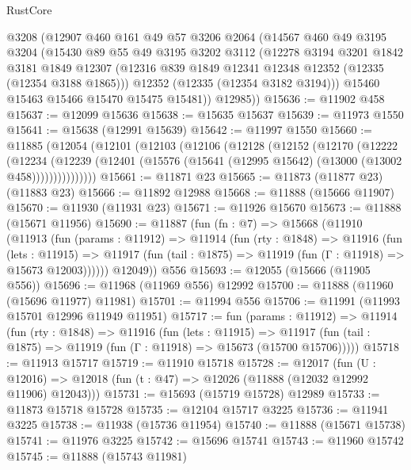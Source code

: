 \begin{lexlean}{RustCore}
\begin{coremodule}
      @3208
      (@12907
        @460
        @161
        @49
        @57
        @3206
        @2064
        (@14567
          @460
          @49
          @3195
          @3204
          (@15430
            @89
            @55
            @49
            @3195
            @3202
            @3112
            (@12278
              @3194
              @3201
              @1842
              @3181
              @1849
              @12307
              (@12316 @839 @1849 @12341 @12348 @12352 (@12335 (@12354 @3188 @1865)))
              @12352
              (@12335 (@12354 @3182 @3194)))
            @15460
            @15463
            @15466
            @15470
            @15475
            @15481))
        @12985))
@15636 := @11902 @458
@15637 := @12099 @15636
@15638 := @15635 @15637
@15639 := @11973 @1550
@15641 := @15638 (@12991 @15639)
@15642 := @11997 @1550
@15660 := @11885
    (@12054
      (@12101
        (@12103
          (@12106
            (@12128
              (@12152
                (@12170
                  (@12222
                    (@12234
                      (@12239
                        (@12401 (@15576 (@15641 (@12995 @15642) (@13000 (@13002 @458)))))))))))))))
@15661 := @11871 @23
@15665 := @11873 (@11877 @23) (@11883 @23)
@15666 := @11892 @12988
@15668 := @11888 (@15666 @11907)
@15670 := @11930 (@11931 @23)
@15671 := @11926 @15670
@15673 := @11888 (@15671 @11956)
@15690 := @11887
    (fun (fn : @7) =>
    @15668
      (@11910
        (@11913
          (fun (params : @11912) =>
          @11914
            (fun (rty : @1848) =>
            @11916
              (fun (lets : @11915) =>
              @11917 (fun (tail : @1875) => @11919 (fun (Γ : @11918) => @15673 @12003))))))
        @12049))
    @556
@15693 := @12055 (@15666 (@11905 @556))
@15696 := @11968 (@11969 @556) @12992
@15700 := @11888 (@11960 (@15696 @11977) @11981)
@15701 := @11994 @556
@15706 := @11991 (@11993 @15701 @12996 @11949 @11951)
@15717 := fun (params : @11912) =>
  @11914
    (fun (rty : @1848) =>
    @11916
      (fun (lets : @11915) =>
      @11917 (fun (tail : @1875) => @11919 (fun (Γ : @11918) => @15673 (@15700 @15706)))))
@15718 := @11913 @15717
@15719 := @11910 @15718
@15728 := @12017
    (fun (U : @12016) => @12018 (fun (t : @47) => @12026 (@11888 (@12032 @12992 @11906) @12043)))
@15731 := @15693 (@15719 @15728) @12989
@15733 := @11873 @15718 @15728
@15735 := @12104 @15717 @3225
@15736 := @11941 @3225
@15738 := @11938 (@15736 @11954)
@15740 := @11888 (@15671 @15738)
@15741 := @11976 @3225
@15742 := @15696 @15741
@15743 := @11960 @15742
@15745 := @11888 (@15743 @11981)

\end{coremodule}
\end{lexlean}
